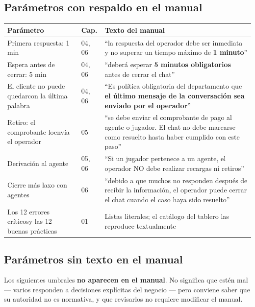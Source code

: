 \documentclass[11pt,a4paper]{article}
\begin{document}
\subsection{Parámetros con respaldo en el manual}

\begin{center}
\begin{tabularx}{\textwidth}{@{}llX@{}}
\toprule
\textbf{Parámetro} & \textbf{Cap.} & \textbf{Texto del manual} \\
\midrule
Primera respuesta: 1 min & 04, 06 &
``la respuesta del operador debe ser inmediata y no superar un tiempo máximo de
\textbf{1 minuto}'' \\
\addlinespace
Espera antes de cerrar: 5 min & 04, 06 &
``deberá esperar \textbf{5 minutos obligatorios} antes de cerrar el chat'' \\
\addlinespace
El cliente no puede quedar\newline con la última palabra & 04, 06 &
``Es política obligatoria del departamento que \textbf{el último mensaje de la conversación
sea enviado por el operador}'' \\
\addlinespace
Retiro: el comprobante lo\newline envía el operador & 05 &
``se debe enviar el comprobante de pago al agente o jugador. El chat no debe marcarse como
resuelto hasta haber cumplido con este paso'' \\
\addlinespace
Derivación al agente & 05, 06 &
``Si un jugador pertenece a un agente, el operador NO debe realizar recargas ni retiros'' \\
\addlinespace
Cierre más laxo con agentes & 06 &
``debido a que muchos no responden después de recibir la información, el operador puede
cerrar el chat cuando el caso haya sido resuelto'' \\
\addlinespace
Los 12 errores críticos\newline y las 12 buenas prácticas & 01 &
Listas literales; el catálogo del tablero las reproduce textualmente \\
\bottomrule
\end{tabularx}
\end{center}

\subsection{Parámetros sin texto en el manual}

Los siguientes umbrales \textbf{no aparecen en el manual}. No significa que estén mal ---
varios responden a decisiones explícitas del negocio --- pero conviene saber que su
autoridad no es normativa, y que revisarlos no requiere modificar el manual.
\end{document}
